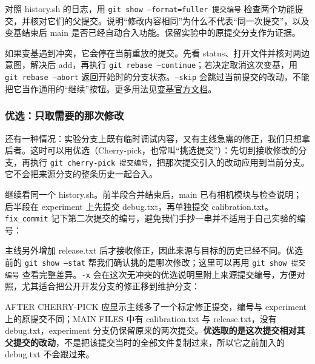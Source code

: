 \begin{exercise}\label{ex:v1-git-rebase}
对照 history.sh 的日志，用 \texttt{git show --format=fuller 提交编号} 检查两个功能提交，并核对它们的父提交。说明“修改内容相同”为什么不代表“同一次提交”，以及变基结束后 main 是否已经自动合入功能。保留实验中的原提交分支作为证据。
\end{exercise}
如果变基遇到冲突，它会停在当前重放的提交。先看 status、打开文件并核对两边意图，解决后 add，再执行 \texttt{git rebase --continue}；若决定取消这次变基，用 \texttt{git rebase --abort} 返回开始时的分支状态。\texttt{--skip} 会跳过当前提交的改动，不能把它当作通用的“继续”按钮。更多用法见\href{https://git-scm.com/docs/git-rebase}{变基官方文档}。

\subsubsection{优选：只取需要的那次修改}
\label{sec:git-cherry-pick}
还有一种情况：实验分支上既有临时调试内容，又有主线急需的修正，我们只想拿后者。这时可以用优选（Cherry-pick，也常叫“挑选提交”）：先切到接收修改的分支，再执行 \texttt{git cherry-pick 提交编号}，把那次提交引入的改动应用到当前分支。它不会把来源分支的整条历史一起合入。
\begin{example}
继续看同一个 history.sh。前半段合并结束后，main 已有相机模块与检查说明；后半段在 experiment 上先提交 debug.txt，再单独提交 calibration.txt。\texttt{fix\_commit} 记下第二次提交的编号，避免我们手抄一串并不适用于自己实验的编号：


主线另外增加 release.txt 后才接收修正，因此来源与目标的历史已经不同。优选前的 \texttt{git show --stat} 帮我们确认挑的是哪次修改；这里可以再用 \texttt{git show 提交编号} 查看完整差异。\texttt{-x} 会在这次无冲突的优选说明里附上来源提交编号，方便对照，尤其适合把公开开发分支的修正移到维护分支：


AFTER CHERRY-PICK 应显示主线多了一个标定修正提交，编号与 experiment 上的原提交不同；MAIN FILES 中有 calibration.txt 与 release.txt，没有 debug.txt，experiment 分支仍保留原来的两次提交。\textbf{优选取的是这次提交相对其父提交的改动}，不是把该提交当时的全部文件复制过来，所以它之前加入的 debug.txt 不会跟过来。
\end{example}
